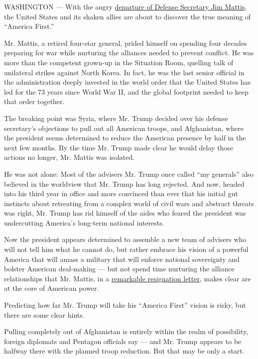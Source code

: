 WASHINGTON --- With the angry
\href{https://www.nytimes3xbfgragh.onion/2018/12/20/us/politics/jim-mattis-defense-secretary-trump.html?action=click\&module=Spotlight\&pgtype=Homepage}{departure
of Defense Secretary Jim Mattis}, the United States and its shaken
allies are about to discover the true meaning of ``America First.''

Mr. Mattis, a retired four-star general, prided himself on spending four
decades preparing for war while nurturing the alliances needed to
prevent conflict. He was more than the competent grown-up in the
Situation Room, quelling talk of unilateral strikes against North Korea.
In fact, he was the last senior official in the administration deeply
invested in the world order that the United States has led for the 73
years since World War II, and the global footprint needed to keep that
order together.

The breaking point was Syria, where Mr. Trump decided over his defense
secretary's objections to pull out all American troops, and Afghanistan,
where the president seems determined to reduce the American presence by
half in the next few months. By the time Mr. Trump made clear he would
delay those actions no longer, Mr. Mattis was isolated.

He was not alone: Most of the advisers Mr. Trump once called ``my
generals'' also believed in the worldview that Mr. Trump has long
rejected. And now, headed into his third year in office and more
convinced than ever that his initial gut instincts about retreating from
a complex world of civil wars and abstract threats was right, Mr. Trump
has rid himself of the aides who feared the president was undercutting
America's long-term national interests.

Now the president appears determined to assemble a new team of advisers
who will not tell him what he cannot do, but rather embrace his vision
of a powerful America that will amass a military that will enforce
national sovereignty and bolster American deal-making --- but not spend
time nurturing the alliance relationships that Mr. Mattis, in a
\href{https://www.nytimes3xbfgragh.onion/2018/12/20/us/politics/letter-jim-mattis-trump.html?action=click\&module=Spotlight\&pgtype=Homepage}{remarkable
resignation letter}, makes clear are at the core of American power.

Predicting how far Mr. Trump will take his ``America First'' vision is
risky, but there are some clear hints.

Pulling completely out of Afghanistan is entirely within the realm of
possibility, foreign diplomats and Pentagon officials say --- and Mr.
Trump appears to be halfway there with the planned troop reduction. But
that may be only a start.


